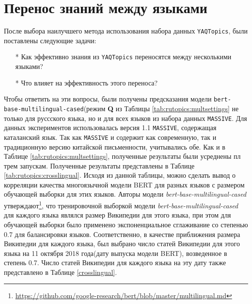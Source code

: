 \section{Перенос знаний между языками}
После выбора наилучшего метода использования набора данных \texttt{YAQTopics}, были поставлены следующие задачи:
\begin{itemize}
\item[*]Как эффективно знания из \texttt{YAQTopics} переносятся между несколькими языками?
\item[*]Что влияет на эффективность этого переноса?
\end{itemize}
Чтобы ответить на эти вопросы, были получены предсказания модели \texttt{bert-base-multilingual-cased}(режим \textbf{Q} из Таблицы \ref{tab:rutopics:multsettings} не только для руссского языка, но и для всех языков из набора данных \texttt{MASSIVE}. Для данных экспериментов использовалась версия 1.1 \texttt{MASSIVE}, содержащая каталанский язык. Так как \texttt{MASSIVE} и содержит как современную, так и традиционную версию китайской письменности, учитывались обе. Как и в Таблице \ref{tab:rutopics:multsettings}, полученные результаты были усреднены пл трем запускам.
Полученные результаты представлены в Таблице \ref{tab:rutopics:crosslingual}. Исходя из данной таблицы, можно сделать вывод о корреляции качества многоязычной модели BERT для разных языков с размером обучающей выборки для этих языков. Авторы модели \textit{bert-base-multilingual-cased} утверждают\footnote{\url{https://github.com/google-research/bert/blob/master/multilingual.md}}, что тренировочной выборкой модели \textit{bert-base-multilingual-cased} для каждого языка являлся размер Википедии для этого языка, при этом для обучающей выборки было применено экспоненциальное сглаживание со степенью 0.7 для балансировки языков.
Соответственно, в качестве приближения размера Википедии для каждого языка, был выбрано число статей Википедии для этого языка на 11 октября 2018 года(дату выпуска модели BERT), возведенное в степень 0.7.  Число статей Википедии для каждого языка на эту дату также представлено в Таблице \ref{crosslingual}.

